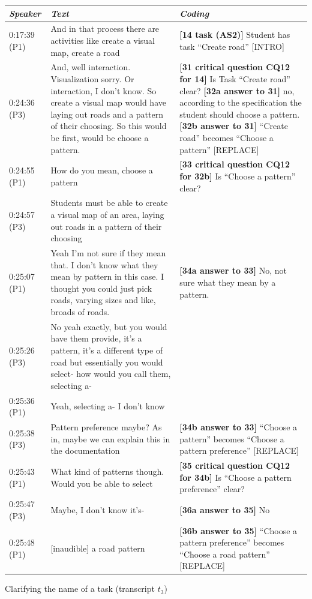 \begin{tabular}{|p{17mm}|p{63mm}|p{70mm}|}
\hline
\textit{Speaker} & \textit{Text} & \textit{Coding}\\
\hline
0:17:39 (P1) & And in that process there are activities like create a visual map, create a road& \textbf{[14 task (AS2)]} Student has task ``Create road'' \textsf{[INTRO]}\\
\hline
0:24:36 (P3)	& And, well interaction. Visualization sorry. Or interaction, I don't know. So create a visual map would have laying out roads and a pattern of their choosing. So this would be first, would be choose a pattern. & \textbf{[31 critical question CQ12 for 14]} Is Task ``Create road'' clear?\newline
\textbf{[32a answer to 31]} no, according to the specification the student should choose a pattern. \newline
\textbf{[32b answer to 31]} ``Create road'' becomes ``Choose a pattern'' \textsf{[REPLACE]}\\
\hline
0:24:55 (P1) &	How do you mean, choose a pattern	& \textbf{[33 critical question CQ12 for 32b]} Is ``Choose a pattern'' clear? \\
\cline{1-2}
0:24:57 (P3)	& Students must be able to create a visual map of an area, laying out roads in a pattern of their choosing	&\\
\cline{1-2}
0:25:07 (P1)	& Yeah I'm not sure if they mean that. I don't know what they mean by pattern in this case. I thought you could just pick roads, varying sizes and like, broads of roads. & 
\textbf{[34a answer to 33]} No, not sure what they mean by a pattern.\\
\cline{1-2}
0:25:26 (P3) & No yeah exactly, but you would have them provide, it's a pattern, it's a different type of road but essentially you would select- how would you call them, selecting a- & \\
\cline{1-2}
0:25:36 (P1) & Yeah, selecting a- I don't know &\\
\cline{1-2}
0:25:38 (P3)	& Pattern preference maybe? As in, maybe we can explain this in the documentation & \textbf{[34b answer to 33]} ``Choose a pattern'' becomes ``Choose a pattern preference'' \textsf{[REPLACE]}\\
\hline
0:25:43 (P1) & What kind of patterns though. Would you be able to select & \textbf{[35 critical question CQ12 for 34b]} Is ``Choose a pattern preference'' clear?\\
\cline{1-2}
0:25:47 (P3) & Maybe, I don't know it's- & \textbf{[36a answer to 35]} No \\
\cline{1-2}
0:25:48 (P1)	& [inaudible] a road pattern& \textbf{[36b answer to 35]} ``Choose a pattern preference'' becomes ``Choose a road pattern'' \textsf{[REPLACE]}\\
\hline
\end{tabular}
\caption{Clarifying the name of a task (transcript $t_3$)}
\label{table:transcript:task-clarification}